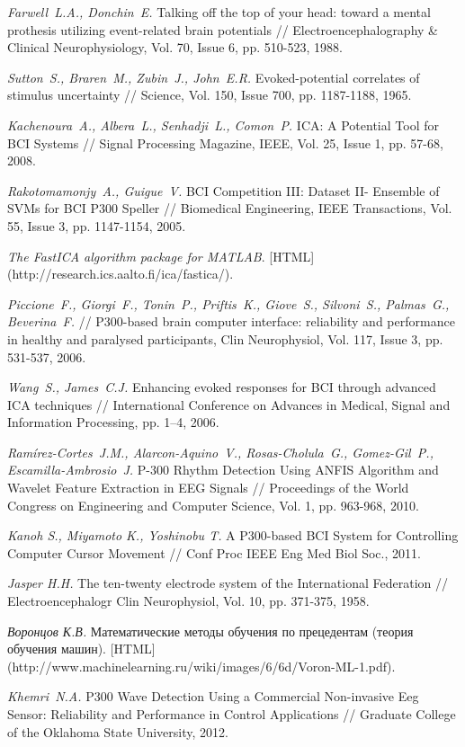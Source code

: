 \documentclass[12pt,a4paper,oneside,fleqn,leqno]{article}
\newcounter{pe} %
\begin{document}
\def\BibUrl#1.{}\def\BibAnnote#1.{}


\begin{thebibliography}{1}

{\it Farwell~L.A., Donchin~E.} Talking off the top of your head: toward a mental prothesis utilizing event-related brain potentials // Electroencephalography \& Clinical Neurophysiology, Vol. 70, Issue 6, pp. 510-523, 1988.

{\it Sutton~S., Braren~M., Zubin~J., John~E.R.} Evoked-potential correlates of stimulus uncertainty // Science, Vol. 150,  Issue 700, pp. 1187-1188, 1965.

{\it Kachenoura~A., Albera~L., Senhadji~L., Comon~P.} ICA: A Potential Tool for BCI Systems // Signal Processing Magazine, IEEE, Vol. 25, Issue 1, pp. 57-68, 2008.

{\it Rakotomamonjy~A., Guigue~V.} BCI Competition III: Dataset II- Ensemble of SVMs for BCI P300 Speller // Biomedical Engineering, IEEE Transactions, Vol. 55, Issue 3, pp. 1147-1154, 2005.

\emph{The FastICA algorithm package for MATLAB}.
[HTML] (http://research.ics.aalto.fi/ica/fastica/).

{\it Piccione~F., Giorgi~F., Tonin~P., Priftis~K., Giove~S., Silvoni~S., Palmas~G., Beverina~F.} // P300-based brain computer interface: reliability and performance in healthy and paralysed participants, Clin Neurophysiol, Vol. 117, Issue 3, pp. 531-537, 2006.

{\it Wang~S., James~C.J.} Enhancing evoked responses for BCI through advanced ICA techniques // International Conference on Advances in Medical, Signal and Information Processing, pp. 1--4, 2006.

{\it Ramírez-Cortes~J.M., Alarcon-Aquino~V., Rosas-Cholula~G., Gomez-Gil~P., Escamilla-Ambrosio~J.} P-300 Rhythm Detection Using ANFIS Algorithm and Wavelet Feature Extraction in EEG Signals // Proceedings of the World Congress on Engineering and Computer Science, Vol. 1,  pp. 963-968, 2010.

{\it Kanoh S., Miyamoto K., Yoshinobu T.} A P300-based BCI System for Controlling Computer Cursor Movement // Conf Proc IEEE Eng Med Biol Soc., 2011.

{\it Jasper H.H.} The ten-twenty electrode system of the International Federation // Electroencephalogr Clin Neurophysiol, Vol. 10, pp. 371-375, 1958.

    {\it Воронцов К.В.} Математические методы обучения по прецедентам (теория обучения машин).
   [HTML] (http://www.machinelearning.ru/wiki/images/6/6d/Voron-ML-1.pdf).

	{\it Khemri~N.A.} P300 Wave Detection Using a Commercial Non-invasive Eeg Sensor: Reliability and Performance in Control Applications // Graduate College of the Oklahoma State University, 2012.



\end{thebibliography}
\end{document}
